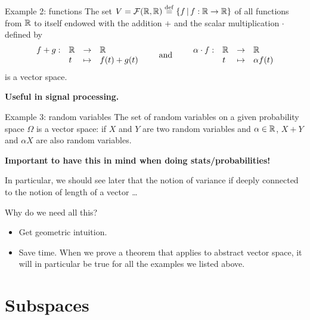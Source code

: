 \documentclass{beamer}
\begin{document}
\begin{frame}{Example 2: functions}
The set $V = \mathcal{F}(\mathbb{R},\mathbb{R}) \overset{\rm def}{=} \{ f \, | \, f: \mathbb{R} \to \mathbb{R} \}$ of all functions from $\mathbb{R}$ to itself endowed with the addition $+$ and the scalar multiplication $\cdot$ defined by
	$$
	\begin{array}{rlll}
		f+g :& \mathbb{R} & \to & \mathbb{R} \\
			 &t & \mapsto & f(t) + g(t)
	\end{array}
	\qquad
	\text{and}
	\qquad
	\begin{array}{rlll}
		\alpha \cdot f :& \mathbb{R} & \to & \mathbb{R} \\
						&t & \mapsto & \alpha f(t)
	\end{array}
	$$
	is a vector space.
	\vspace{0.4cm}
	\begin{center}
	\textbf{Useful in signal processing.}
	\end{center}
\end{frame}

\begin{frame}{Example 3: random variables}
The set of random variables on a given probability space $\Omega$ is a vector space: if $X$ and $Y$ are two random variables and $\alpha \in \mathbb{R}$, $X+Y$ and $\alpha X$ are also random variables.

	\vspace{0.8cm}
	\begin{center}
	\textbf{Important to have this in mind when doing stats/probabilities!}
	\end{center}
	In particular, we should see later that the notion of variance if deeply connected to the notion of length of a vector \dots
\end{frame}

\begin{frame}{Why do we need all this?}
	\begin{itemize}
		\item Get geometric intuition. 
		\item Save time. When we prove a theorem that applies to abstract vector space, it will in particular be true for all the examples we listed above.
	\end{itemize}
\end{frame}

\section{Subspaces}
\end{document}
